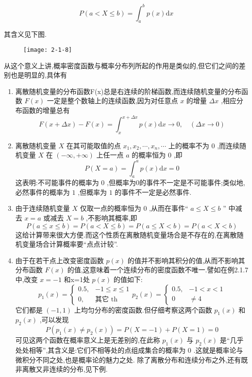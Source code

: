 \[ 
P(a<X \leqslant b)=\int_{a}^{b} p(x) \mathrm{d} x
\]

其含义见下图.



\begin{figure}
	\centering
	\texttt{[image: 2-1-8]}
	\caption{}
	\label{fig:2-1-8}
\end{figure}

从这个意义上讲,概率密度函数与概率分布列所起的作用是类似的,但它们之间的差别也是明显的,具体有

\begin{enumerate}
	\item 离散随机变量的分布函数F(x)总是右连续的阶梯函数,而连续随机变量的分布函数 $ F(x) $ 一定是整个数轴上的连续函数,因为对任意点 $ x $ 的增量 $ \Delta x $ ,相应分布函数的增量总有
	\[ 
	F(x+\Delta x)-F(x)=\int_{x}^{x+\Delta x} p(x) \mathrm{d} x \longrightarrow 0, \quad(\Delta x \rightarrow 0)
	\]
	\item 离散随机变量 $ X $ 在其可能取值的点 $ x_{1}, x_{2}, \cdots, x_{n}, \cdots $ 上的概率不为 $ 0 $ ,而连续随机变量 $ X $ 在 $ (-\infty,+\infty) $ 上任一点 $ a $ 的概率恒为 $ 0 $ ,即
	\[ 
	P(X=a)=\int_{a}^{a} p(x) \mathrm{d} x=0
	\]
	这表明:不可能事件的概率为 $ 0 $ ,但概率为0的事件不一定是不可能事件;类似地,必然事件的概率为 $ 1 $ ,但概率为 $ 1 $ 的事件不一定是必然事件.
	\item 由于连续随机变量 $ X $ 仅取一点的概率恒为 $ 0 $ ,从而在事件“ $ a \leqslant X \leqslant b $ ”
	中减去 $ x=a $ 或减去 $ X=b $ ,不影响其概率,即
	\[ 
	P(a \leqslant x \leqslant b)=P(a<X \leqslant b)=P(a \leqslant X<b)=P(a<X<b)
	\]
	这给计算带来很大方便.而这个性质在离散随机变量场合是不存在的,在离散随机变量场合计算概率要“点点计较”.
	\item 由于在若干点上改变密度函数 $ p(x) $ 的值并不影响其积分的值,从而不影响其分布函数 $ F(x) $ 的值,这意味着一个连续分布的密度函数不唯一.譬如在例2.1.7中,改变 $ x=-1 $ 和x=1处 $ p(x) $ 的值如下:
	\[ 
	p_{1}(x)=\left\{\begin{array}{ll}{0.5,} & {-1 \leqslant x \leqslant 1} \\ {0,} & {\text{其它} \text { th }}\end{array}\right. p_{2}(x)=\left\{\begin{array}{ll}{0.5,} & {-1<x<1} \\ {0} & { \neq 4}\end{array}\right.
	\]
	它们都是 $ (-1,1) $ 上均匀分布的密度函数.但仔细考察这两个函数 $ p_1(x) $ 和 $ p_2(x) $ ,可以发现
	\[ 
	P\left(p_{1}(x) \neq p_{2}(x)\right)=P(X=-1)+P(X=1)=0
	\]
	可见这两个函数在概率意义上是无差别的,在此称 $ p_1(x) $ 与 $ p_2(x) $ 是“几乎处处相等”,其含义是:它们不相等处的点组成集合的概率为 $ 0 $ .这就是概率论与微积分不同之处,也是概率论的魅力之处.
	除了离散分布和连续分布之外,还有既非离散又非连续的分布,见下例.
\end{enumerate}


